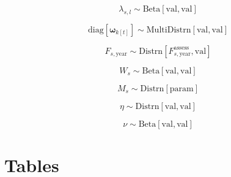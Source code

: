 \documentclass{article}
\begin{document}
\begin{equation}
  \label{eq:prior-selectivity}
  \lambda_{s,l} \sim \mathrm{Beta} \! \left[ \mathrm{val, val} \right]
\end{equation}

\begin{equation}
  \label{eq:prior-weight}
  \mathrm{diag} \! \left[ \boldsymbol{\omega}_{k[t]} \right] \sim 
    \mathrm{MultiDistrn} \! \left[  \mathrm{val, val} \right]
\end{equation}

\begin{equation}
  \label{eq:prior-fishing}
  F_{s,\mathrm{year}} \sim 
    \mathrm{Distrn} \! \left[ F^{\mathrm{assess}}_{s,\mathrm{year}} \mathrm{, val} \right]
\end{equation}

\begin{equation}
  \label{eq:prior-reporting}
  W_{s} \sim \mathrm{Beta} \! \left[ \mathrm{val, val} \right]
\end{equation}

\begin{equation}
  \label{eq:prior-mortality}
  M_{s}  \sim \mathrm{Distrn} \! \left[ \mathrm{param} \right]
\end{equation}

\begin{equation}
  \label{eq:prior-tagloss}
  \eta \sim \mathrm{Distrn} \! \left[ \mathrm{val, val} \right]
\end{equation}

\begin{equation}
  \label{eq:prior-initloss}
  \nu \sim \mathrm{Beta} \! \left[ \mathrm{val, val}  \right]
\end{equation}

\newpage
\section{Tables}
\end{document}

